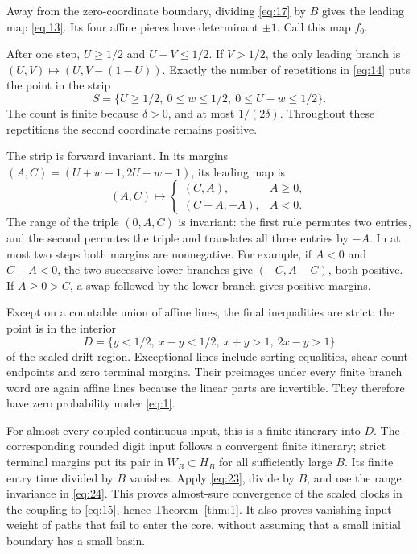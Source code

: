 \documentclass[11pt]{amsart}
\begin{document}
Away from the zero-coordinate boundary, dividing \eqref{eq:17} by \(B\) gives the leading map \eqref{eq:13}. Its four affine pieces have determinant \(\pm1\). Call this map \(f_0\).

After one step, \(U\ge1/2\) and \(U-V\le1/2\). If \(V>1/2\), the only leading branch is \((U,V)\mapsto(U,V-(1-U))\). Exactly the number of repetitions in \eqref{eq:14} puts the point in the strip \[S=\{U\ge1/2,\ 0\le w\le1/2,\ 0\le U-w\le1/2\}.\] The count is finite because \(\delta>0\), and at most \(1/(2\delta)\). Throughout these repetitions the second coordinate remains positive.

The strip is forward invariant. In its margins \((A,C)=(U+w-1,2U-w-1)\), its leading map is \begin{equation}\label{eq:24}
(A,C)\mapsto
 \begin{cases}(C,A),&A\ge0,\\(C-A,-A),&A<0.\end{cases}
\end{equation} The range of the triple \((0,A,C)\) is invariant: the first rule permutes two entries, and the second permutes the triple and translates all three entries by \(-A\). In at most two steps both margins are nonnegative. For example, if \(A<0\) and \(C-A<0\), the two successive lower branches give \((-C,A-C)\), both positive. If \(A\ge0>C\), a swap followed by the lower branch gives positive margins.

Except on a countable union of affine lines, the final inequalities are strict: the point is in the interior \[D=\{y<1/2,\ x-y<1/2,\ x+y>1,\ 2x-y>1\}\] of the scaled drift region. Exceptional lines include sorting equalities, shear-count endpoints and zero terminal margins. Their preimages under every finite branch word are again affine lines because the linear parts are invertible. They therefore have zero probability under \eqref{eq:1}.

For almost every coupled continuous input, this is a finite itinerary into \(D\). The corresponding rounded digit input follows a convergent finite itinerary; strict terminal margins put its pair in \(W_B\subset H_B\) for all sufficiently large \(B\). Its finite entry time divided by \(B\) vanishes. Apply \eqref{eq:23}, divide by \(B\), and use the range invariance in \eqref{eq:24}. This proves almost-sure convergence of the scaled clocks in the coupling to \eqref{eq:15}, hence Theorem~\ref{thm:1}. It also proves vanishing input weight of paths that fail to enter the core, without assuming that a small initial boundary has a small basin.
\end{document}
